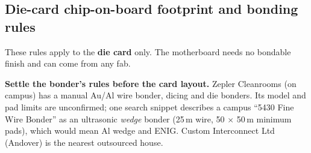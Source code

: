 \documentclass[10pt,a4paper]{article}
\begin{document}
\subsection{Die-card chip-on-board footprint and bonding rules}\label{sec:cob}
These rules apply to the \textbf{die card} only. The motherboard needs no bondable finish and can come from any fab.

\textbf{Settle the bonder's rules before the card layout.} Zepler Cleanrooms (on campus) has a manual Au/Al wire bonder, dicing and die bonders. Its model and pad limits are unconfirmed; one search snippet describes a campus ``5430 Fine Wire Bonder'' as an ultrasonic \emph{wedge} bonder (25\,\textmu m wire, 50 $\times$ 50\,\textmu m minimum pads), which would mean Al wedge and ENIG. Custom Interconnect Ltd (Andover) is the nearest outsourced house.
\end{document}

